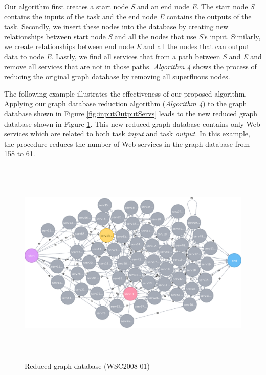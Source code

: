 \par

Our algorithm first creates a start node \emph{S} and an end node \emph{E}. The start node \emph{S} contains the inputs of the task and the end node \emph{E}  contains the outputs of the task. Secondly, we insert these nodes into the database by creating new relationships between start node \emph{S} and all the nodes that use \emph{S}'s input. Similarly, we create relationships between end node \emph{E} and all the nodes that can output data to node \emph{E}. Lastly, we find all services that from a path between \emph{S} and \emph{E} and remove all services that are not in those paths. \emph{Algorithm 4} shows the process of reducing the original graph database by removing all superfluous nodes.

\begin{exmp}
\noindent
The following example illustrates the effectiveness of our proposed algorithm. Applying our graph database reduction algorithm (\emph{Algorithm 4}) to the graph database shown in Figure \ref{fig:inputOutputServs} leads to the new reduced graph database shown in Figure \ref{fig:reduced}. This new reduced graph database contains only Web services which are related to both task \emph{input} and task \emph{output}. In this example, the procedure reduces the number of Web services in the graph database from 158 to 61.
\end{exmp}

\begin{figure}[h]
\includegraphics[width = 13cm, height = 10cm, scale = 0.5]{svg-reduced.pdf}
\centering
\caption{Reduced graph database (WSC2008-01)}
\label{fig:reduced} 
\end{figure} 

